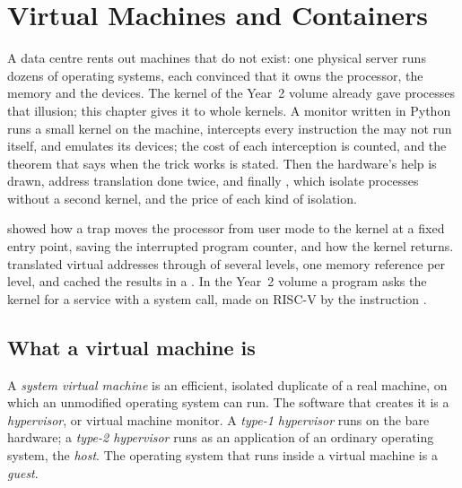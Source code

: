 \chapter{Virtual Machines and Containers}\label{ch:b3:virtualisation}

A data centre rents out machines that do not exist: one physical server runs dozens of operating systems, each convinced that it owns the processor, the memory and the devices. The kernel of the Year~2 volume already gave processes that illusion; this chapter gives it to whole kernels. A monitor written in Python runs a small  kernel on the  machine, intercepts every instruction the  may not run itself, and emulates its devices; the cost of each interception is counted, and the theorem that says when the trick works is stated. Then the hardware's help is drawn, address translation done twice, and finally , which isolate processes without a second kernel, and the price of each kind of isolation.

\begin{recall}
 showed how a trap moves the processor from user mode to the kernel at a fixed entry point, saving the interrupted program counter, and how the kernel returns.  translated virtual addresses through  of several levels, one memory reference per level, and cached the results in a . In the Year~2 volume a program asks the kernel for a service with a system call, made on RISC-V by the instruction .
\end{recall}

\section{What a virtual machine is}\label{sec:b3:virtualisation:vm}

\begin{definition}\label{def:b3:virtualisation:vm}
A \emph{system virtual machine} is an efficient, isolated duplicate of a real machine, on which an unmodified operating system can run. The software that creates it is a \emph{hypervisor}, or virtual machine monitor. A \emph{type-1 hypervisor} runs on the bare hardware; a \emph{type-2 hypervisor} runs as an application of an ordinary operating system, the \emph{host}. The operating system that runs inside a virtual machine is a \emph{guest}.
\end{definition}

